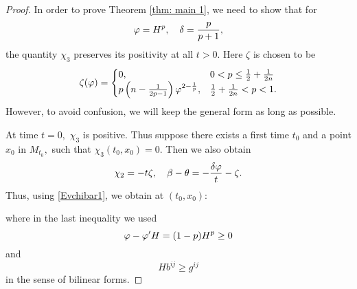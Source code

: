 \documentclass{amsart}
\begin{document}
\begin{proof}
In order to prove Theorem \ref{thm: main 1}, we need to show that for
$$\varphi=H^{p},\quad \delta=\frac{p}{p+1},$$
the quantity $\chi_3$ preserves its positivity at all $t>0.$ Here $\zeta$ is chosen to be
$$\zeta(\varphi)=\begin{cases} 0, &0<p\leq \frac{1}{2}+\frac{1}{2n}\\
                    p\left(n-\frac{1}{2p-1}\right)\varphi^{2-\frac{1}{p}}, &\frac{1}{2}+\frac{1}{2n}<p< 1.\end{cases}$$
However, to avoid confusion, we will keep the general form as long as possible.

At time $t=0,$ $\chi_3$ is positive.
Thus suppose there exists a first time $t_0$ and a point $x_0$ in $M_{t_0},$ such that $\chi_3(t_0,x_0)=0.$
Then we also obtain
$$\chi_2=-t\zeta,\quad \beta-\theta=-\frac{\delta\varphi}{t}-\zeta.$$
Thus, using \eqref{Evchibar1}, we obtain at $(t_0,x_0):$

where in the last inequality we used
$$\varphi-\varphi'H=(1-p)H^p\geq 0$$
and
$$Hb^{ij}\geq g^{ij}$$
in the sense of bilinear forms.


\end{proof}
\end{document}
